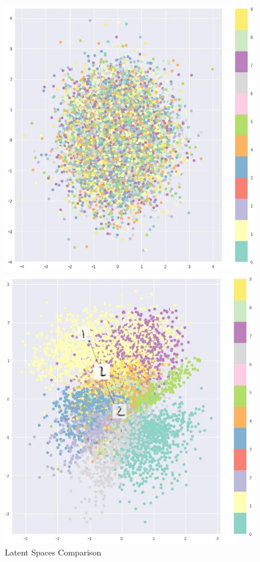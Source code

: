 \begin{figure}[!htbp]
\begin{minipage}[t]{.3\textwidth}
        \includegraphics[width=\textwidth]{tikz/chapter9 - Latent Space VAEs 2.jpeg}
    \end{minipage}  
    \hfill
    \begin{minipage}[t]{.3\textwidth}
        \centering
        \includegraphics[width=\textwidth]{tikz/chapter9 - Latent Space VAEs 3.jpeg}
    \end{minipage}  
    \caption{Latent Spaces Comparison}
\end{figure}

